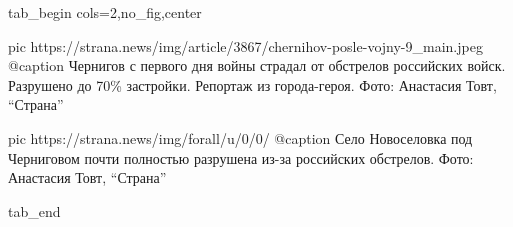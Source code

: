  
 
 
 
 

\ifcmt
  tab_begin cols=2,no_fig,center

     pic https://strana.news/img/article/3867/chernihov-posle-vojny-9_main.jpeg
		 @caption Чернигов с первого дня войны страдал от обстрелов российских войск. Разрушено до 70\% застройки. Репортаж из города-героя. Фото: Анастасия Товт, \enquote{Страна} 

		 pic https://strana.news/img/forall/u/0/0/%
		 @caption Село Новоселовка под Черниговом почти полностью разрушена из-за российских обстрелов. Фото: Анастасия Товт, \enquote{Страна}

  tab_end
\fi
